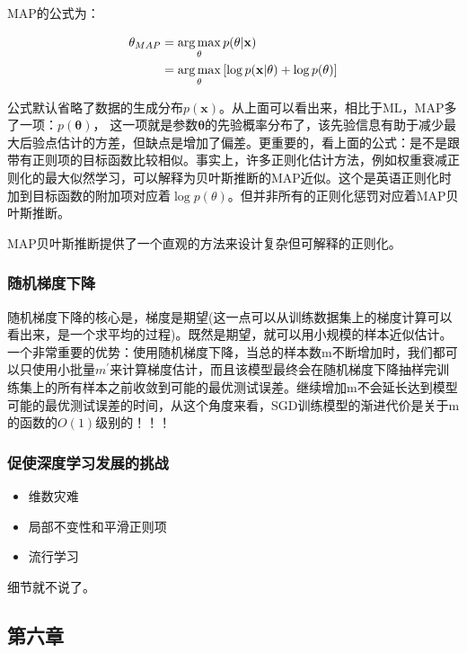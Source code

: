 MAP的公式为：

\begin{align*}
\mathbf{\theta}_{MAP} & = \operatorname*{arg\,max}_{\mathbf{\theta}} p(\mathbf{\theta} | \mathbf{x}) \\
				& = \operatorname*{arg\,max}_{\mathbf{\theta}} \left[ \log p(\mathbf{x}|\mathbf{\theta}) + \log p(\mathbf{\theta}) \right]
\end{align*}

公式默认省略了数据的生成分布$p(\mathbf{x})$。从上面可以看出来，相比于ML，MAP多了一项：$ p(\mathbf{\theta})$， 这一项就是参数$\mathbf{\theta}$的先验概率分布了，该先验信息有助于减少最大后验点估计的方差，但缺点是增加了偏差。更重要的，看上面的公式：是不是跟带有正则项的目标函数比较相似。事实上，许多正则化估计方法，例如权重衰减正则化的最大似然学习，可以解释为贝叶斯推断的MAP近似。这个是英语正则化时加到目标函数的附加项对应着$\log p(\theta)$。但并非所有的正则化惩罚对应着MAP贝叶斯推断。

MAP贝叶斯推断提供了一个直观的方法来设计复杂但可解释的正则化。

\subsubsection{随机梯度下降}

随机梯度下降的核心是，梯度是期望(这一点可以从训练数据集上的梯度计算可以看出来，是一个求平均的过程)。既然是期望，就可以用小规模的样本近似估计。一个非常重要的优势：使用随机梯度下降，当总的样本数m不断增加时，我们都可以只使用小批量$m^{'}$来计算梯度估计，而且该模型最终会在随机梯度下降抽样完训练集上的所有样本之前收敛到可能的最优测试误差。继续增加m不会延长达到模型可能的最优测试误差的时间，从这个角度来看，SGD训练模型的渐进代价是关于m的函数的$O(1)$级别的！！！

\subsubsection{促使深度学习发展的挑战}

\begin{itemize}
\item 维数灾难
\item 局部不变性和平滑正则项
\item 流行学习
\end{itemize}

细节就不说了。

\subsection{第六章}

